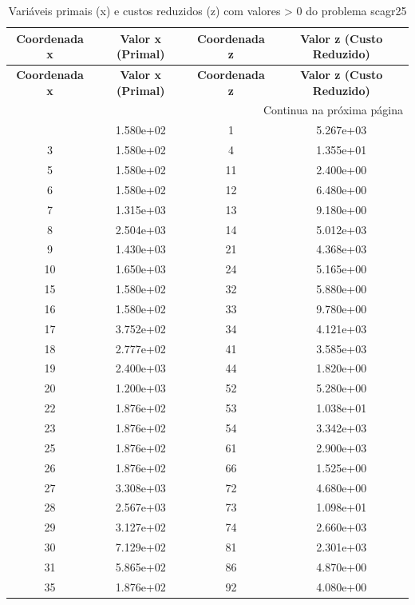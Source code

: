\documentclass[12pt]{article}
\begin{document}
\begin{longtable}{@{}cccc@{}}
\caption{Variáveis primais (x) e custos reduzidos (z) com valores > 0 do problema scagr25} \\
\toprule
\textbf{Coordenada x} & \textbf{Valor x (Primal)} & \textbf{Coordenada z} & \textbf{Valor z (Custo Reduzido)} \\
\midrule
\endfirsthead

\toprule
\textbf{Coordenada x} & \textbf{Valor x (Primal)} & \textbf{Coordenada z} & \textbf{Valor z (Custo Reduzido)} \\
\midrule
\endhead

\midrule \multicolumn{4}{r}{{Continua na próxima página}} \\ \midrule
\endfoot

\bottomrule
\endlastfoot
2 & 1.580e+02 & 1 & 5.267e+03 \\
3 & 1.580e+02 & 4 & 1.355e+01 \\
5 & 1.580e+02 & 11 & 2.400e+00 \\
6 & 1.580e+02 & 12 & 6.480e+00 \\
7 & 1.315e+03 & 13 & 9.180e+00 \\
8 & 2.504e+03 & 14 & 5.012e+03 \\
9 & 1.430e+03 & 21 & 4.368e+03 \\
10 & 1.650e+03 & 24 & 5.165e+00 \\
15 & 1.580e+02 & 32 & 5.880e+00 \\
16 & 1.580e+02 & 33 & 9.780e+00 \\
17 & 3.752e+02 & 34 & 4.121e+03 \\
18 & 2.777e+02 & 41 & 3.585e+03 \\
19 & 2.400e+03 & 44 & 1.820e+00 \\
20 & 1.200e+03 & 52 & 5.280e+00 \\
22 & 1.876e+02 & 53 & 1.038e+01 \\
23 & 1.876e+02 & 54 & 3.342e+03 \\
25 & 1.876e+02 & 61 & 2.900e+03 \\
26 & 1.876e+02 & 66 & 1.525e+00 \\
27 & 3.308e+03 & 72 & 4.680e+00 \\
28 & 2.567e+03 & 73 & 1.098e+01 \\
29 & 3.127e+02 & 74 & 2.660e+03 \\
30 & 7.129e+02 & 81 & 2.301e+03 \\
31 & 5.865e+02 & 86 & 4.870e+00 \\
35 & 1.876e+02 & 92 & 4.080e+00 \\

\end{longtable}
\end{document}
